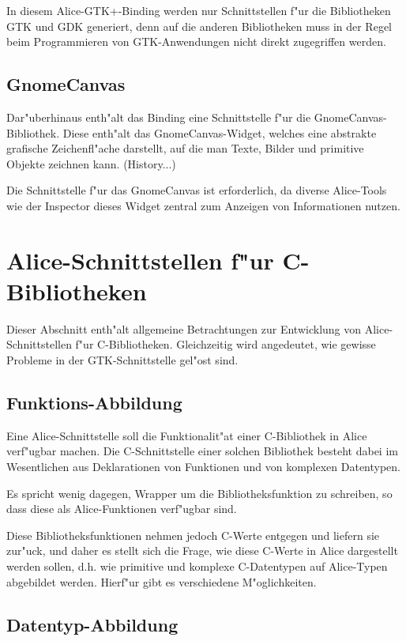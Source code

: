 \documentclass{article}
\begin{document}
In diesem Alice-GTK+-Binding werden nur Schnittstellen f"ur die Bibliotheken
GTK und GDK generiert, denn auf die anderen Bibliotheken muss in der Regel beim
Programmieren von GTK-Anwendungen nicht direkt zugegriffen werden.

\subsection{GnomeCanvas}

Dar"uberhinaus enth"alt das Binding eine Schnittstelle f"ur die GnomeCanvas-
Bibliothek. Diese enth"alt das GnomeCanvas-Widget, welches eine abstrakte
grafische Zeichenfl"ache darstellt, auf die man Texte, Bilder und primitive
Objekte zeichnen kann. 
(History...)

Die Schnittstelle f"ur das GnomeCanvas ist erforderlich, da diverse Alice-Tools
wie der Inspector dieses Widget zentral zum Anzeigen von Informationen
nutzen.

\section{Alice-Schnittstellen f"ur C-Bibliotheken}

Dieser Abschnitt enth"alt allgemeine Betrachtungen zur Entwicklung von
Alice-Schnittstellen f"ur C-Bibliotheken. Gleichzeitig wird angedeutet,
wie gewisse Probleme in der GTK-Schnittstelle gel"ost sind.

\subsection{Funktions-Abbildung}

Eine Alice-Schnittstelle soll die Funktionalit"at einer C-Bibliothek
in Alice verf"ugbar machen. Die C-Schnittstelle einer solchen Bibliothek
besteht dabei im Wesentlichen aus Deklarationen von Funktionen und von
komplexen Datentypen.

Es spricht wenig dagegen, Wrapper um die Bibliotheksfunktion zu schreiben,
so dass diese als Alice-Funktionen verf"ugbar sind. 

Diese Bibliotheksfunktionen nehmen jedoch C-Werte entgegen und liefern sie
zur"uck, und daher es stellt sich die Frage, wie diese C-Werte in Alice
dargestellt werden sollen, d.h. wie primitive und komplexe C-Datentypen
auf Alice-Typen abgebildet werden.
Hierf"ur gibt es verschiedene M"oglichkeiten.

\subsection{Datentyp-Abbildung}
\end{document}
